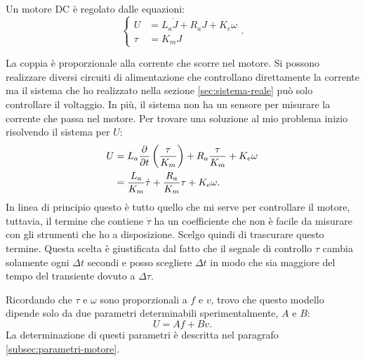 Un motore DC è regolato dalle equazioni: 
\begin{equation*}
    \left\{
    \begin{aligned}
        U &= L_a \dot J + R_a J + K_e \omega \\
        \tau &= K_m J
    \end{aligned}
    \right.
    .
\end{equation*}

La coppia è proporzionale alla corrente che scorre nel motore. Si possono realizzare diversi circuiti di alimentazione che controllano direttamente la corrente ma il sistema che ho realizzato nella sezione \ref{sec:sistema-reale} può solo controllare il voltaggio. In più, il sistema non ha un sensore per misurare la corrente che passa nel motore.
Per trovare una soluzione al mio problema inizio risolvendo il sistema per $U$:
\begin{equation*}
    \begin{aligned}
        U &= L_a \frac \partial {\partial t} \left(\frac \tau {K_m}\right) + R_a \frac \tau {K_m} + K_e \omega \\
        &= \frac {L_a} {K_m} \dot\tau + \frac{R_a}{K_m}  \tau + K_e \omega.
    \end{aligned}
\end{equation*}
In linea di principio questo è tutto quello che mi serve per controllare il motore, tuttavia, il termine che contiene $\dot \tau$ ha un coefficiente che non è facile da misurare con gli strumenti che ho a disposizione. Scelgo quindi di trascurare questo termine. Questa scelta è giustificata dal fatto che il segnale di controllo $\tau$ cambia solamente ogni $\Delta t$ secondi e posso scegliere $\Delta t$ in modo che sia maggiore del tempo del transiente dovuto a $\Delta \tau$.

Ricordando che $\tau$ e $\omega$ sono proporzionali a $f$ e $v$, trovo che questo modello dipende solo da due parametri determinabili sperimentalmente, $A$ e $B$:
\begin{equation*}
    U = A f + B v.
\end{equation*}
La determinazione di questi parametri è descritta nel paragrafo \ref{subsec:parametri-motore}.
